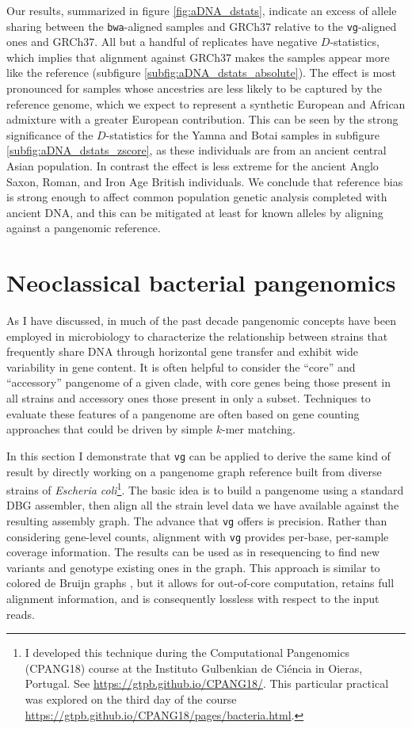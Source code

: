 Our results, summarized in figure \ref{fig:aDNA_dstats}, indicate an excess of allele sharing between the {\tt bwa}-aligned samples and GRCh37 relative to the {\tt vg}-aligned ones and GRCh37.
All but a handful of replicates have negative $D$-statistics, which implies that alignment against GRCh37 makes the samples appear more like the reference (subfigure \ref{subfig:aDNA_dstats_absolute}).
The effect is most pronounced for samples whose ancestries are less likely to be captured by the reference genome, which we expect to represent a synthetic European and African admixture with a greater European contribution.
This can be seen by the strong significance of the $D$-statistics for the Yamna and Botai samples in subfigure \ref{subfig:aDNA_dstats_zscore}, as these individuals are from an ancient central Asian population.
In contrast the effect is less extreme for the ancient Anglo Saxon, Roman, and Iron Age British individuals.
We conclude that reference bias is strong enough to affect common population genetic analysis completed with ancient DNA, and this can be mitigated at least for known alleles by aligning against a pangenomic reference.

\section{Neoclassical bacterial pangenomics}

As I have discussed, in much of the past decade pangenomic concepts have been employed in microbiology to characterize the relationship between strains that frequently share DNA through horizontal gene transfer and exhibit wide variability in gene content.
It is often helpful to consider the ``core'' and ``accessory'' pangenome of a given clade, with core genes being those present in all strains and accessory ones those present in only a subset.
Techniques to evaluate these features of a pangenome are often based on gene counting approaches that could be driven by simple $k$-mer matching.

In this section I demonstrate that {\tt vg} can be applied to derive the same kind of result by directly working on a pangenome graph reference built from diverse strains of \emph{Escheria coli}\footnote{I developed this technique during the Computational Pangenomics (CPANG18) course at the Instituto Gulbenkian de Ci\'{e}ncia in Oieras, Portugal. See \url{https://gtpb.github.io/CPANG18/}. This particular practical was explored on the third day of the course \url{https://gtpb.github.io/CPANG18/pages/bacteria.html}.}.
The basic idea is to build a pangenome using a standard DBG assembler, then align all the strain level data we have available against the resulting assembly graph. 
The advance that {\tt vg} offers is precision.
Rather than considering gene-level counts, alignment with {\tt vg} provides per-base, per-sample coverage information.
The results can be used as in resequencing to find new variants and genotype existing ones in the graph.
This approach is similar to colored de Bruijn graphs \cite{iqbal2013}, but it allows for out-of-core computation, retains full alignment information, and is consequently lossless with respect to the input reads.

